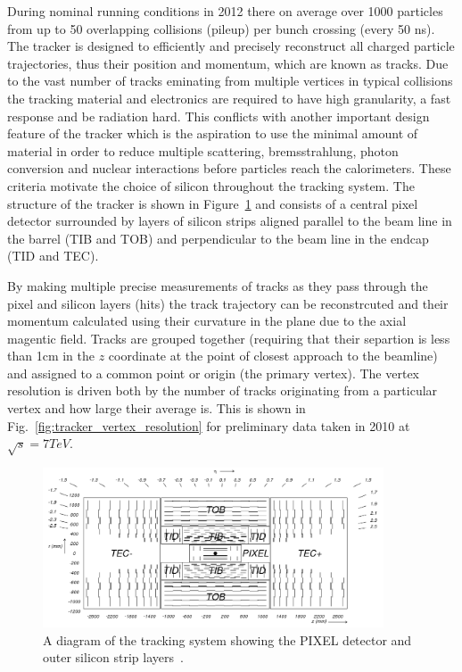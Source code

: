 During nominal \LHC running conditions in 2012 there on average over 1000 particles from up to 50 overlapping \pp collisions (pileup) per bunch crossing (every 50 ns). The tracker is designed to efficiently and precisely reconstruct all charged particle trajectories, thus their position and momentum, which are known as tracks. Due to the vast number of tracks eminating from multiple vertices in typical \LHC collisions the tracking material and electronics are required to have high granularity, a fast response and be radiation hard. This conflicts with another important design feature of the tracker which is the aspiration to use the minimal amount of material in order to reduce multiple scattering, bremsstrahlung, photon conversion and nuclear interactions before particles reach the calorimeters. These criteria motivate the choice of silicon throughout the \CMS tracking system. The structure of the \CMS tracker is shown in Figure~\ref{fig:cms_tracker} and consists of a central pixel detector surrounded by layers of silicon strips aligned parallel to the beam line in the barrel (TIB and TOB) and perpendicular to the beam line in the endcap (TID and TEC).

By making multiple precise measurements of tracks as they pass through the pixel and silicon layers (hits) the track trajectory can be reconstrcuted and their momentum calculated using their curvature in the \phi plane due to the axial magentic field. Tracks are grouped together (requiring that their separtion is less than 1cm in the $z$ coordinate at the point of closest approach to the beamline) and assigned to a common point or origin (the primary vertex). The vertex resolution is driven both by the number of tracks originating from a particular vertex and how large their average \pT is. This is shown in Fig.~\ref{fig:tracker_vertex_resolution} for preliminary data taken in 2010 at $\sqrt{s}=7TeV$.

\begin{figure}
  \includegraphics[width=0.9\textwidth]{ch2_cms_exp/plots/fig_cmstracker.png}
  \caption[CMS tracker]{A diagram of the \CMS tracking system showing the PIXEL detector and outer silicon strip layers~\cite{CMS_JINST}.}
  \label{fig:cms_tracker}
\end{figure}

